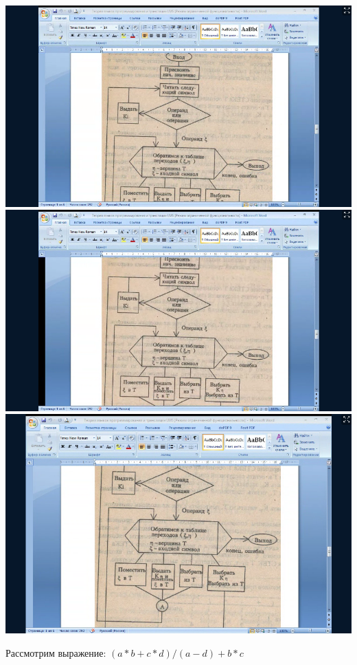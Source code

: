 \documentclass{article}
\begin{document}
    \begin{table}
        
    \end{table}
    \includegraphics[scale=0.5]{2.png}
    \includegraphics[scale=0.5]{3.png}
    \includegraphics[scale=0.5]{4.png}

    Рассмотрим выражение: $(a*b+c*d)/(a-d)+b*c$ \\
\end{document}
